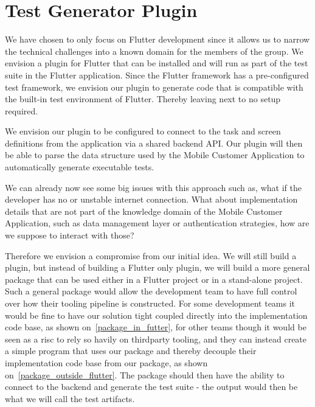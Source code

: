 \section{Test Generator Plugin}
We have chosen to only focus on Flutter development since it allows us to narrow the technical challenges into a known domain for the members of the group.
We envision a plugin for Flutter that can be installed and will run as part of the test suite in the Flutter application.
Since the Flutter framework has a pre-configured test framework, we envision our plugin to generate code that is compatible with the built-in test environment of Flutter.
Thereby leaving next to no setup required.

We envision our plugin to be configured to connect to the task and screen definitions from the application via a shared backend API.
Our plugin will then be able to parse the data structure used by the Mobile Customer Application to automatically generate executable tests.

We can already now see some big issues with this approach such as, what if the developer has no or unstable internet connection.
What about implementation details that are not part of the knowledge domain of the Mobile Customer Application, such as data management layer or authentication strategies, how are we suppose to interact with those?

Therefore we envision a compromise from our initial idea. 
We will still build a plugin, but instead of building a Flutter only plugin, we will build a more general package that can be used either in a Flutter project or in a stand-alone project.
Such a general package would allow the development team to have full control over how their tooling pipeline is constructed.
For some development teams it would be fine to have our solution tight coupled directly into the implementation code base, as shown on~\autoref{package_in_futter}, for other teams though it would be seen as a risc to rely so havily on thirdparty tooling, and they can instead create a simple program that uses our package and thereby decouple their implementation code base from our package, as shown on~\autoref{package_outside_flutter}. 
The package should then have the ability to connect to the backend and generate the test suite - the output would then be what we will call the test artifacts.

